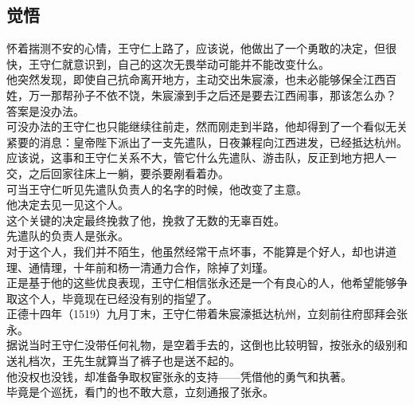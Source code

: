 \begin{multicols}{\theparacolNo}
\subsection{觉悟}
怀着揣测不安的心情，王守仁上路了，应该说，他做出了一个勇敢的决定，但很快，王守仁就意识到，自己的这次无畏举动可能并不能改变什么。\\

他突然发现，即使自己抗命离开地方，主动交出朱宸濠，也未必能够保全江西百姓，万一那帮孙子不依不饶，朱宸濠到手之后还是要去江西闹事，那该怎么办？\\

答案是没办法。\\

可没办法的王守仁也只能继续往前走，然而刚走到半路，他却得到了一个看似无关紧要的消息：皇帝陛下派出了一支先遣队，日夜兼程向江西进发，已经抵达杭州。\\

应该说，这事和王守仁关系不大，管它什么先遣队、游击队，反正到地方把人一交，之后回家往床上一躺，要杀要剐看着办。\\

可当王守仁听见先遣队负责人的名字的时候，他改变了主意。\\

他决定去见一见这个人。\\

这个关键的决定最终挽救了他，挽救了无数的无辜百姓。\\

先遣队的负责人是张永。\\

对于这个人，我们并不陌生，他虽然经常干点坏事，不能算是个好人，却也讲道理、通情理，十年前和杨一清通力合作，除掉了刘瑾。\\

正是基于他的这些优良表现，王守仁相信张永还是一个有良心的人，他希望能够争取这个人，毕竟现在已经没有别的指望了。\\

正德十四年（1519）九月丁末，王守仁带着朱宸濠抵达杭州，立刻前往府邸拜会张永。\\

据说当时王守仁没带任何礼物，是空着手去的，这倒也比较明智，按张永的级别和送礼档次，王先生就算当了裤子也是送不起的。\\

他没权也没钱，却准备争取权宦张永的支持——凭借他的勇气和执著。\\

毕竟是个巡抚，看门的也不敢大意，立刻通报了张永。\\


\end{multicols}
